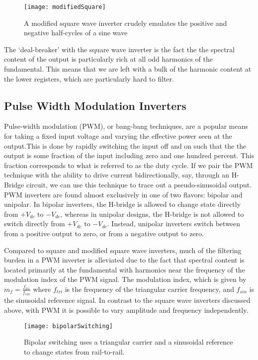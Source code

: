 \begin{figure}[h]
\centering
\texttt{[image: modifiedSquare]}
\caption{A modified square wave inverter crudely emulates the positive and negative half-cycles of a sine wave \cite{inverterFourier}}
\label{modifiedSquare}
\end{figure}

The `deal-breaker' with the square wave inverter is the fact the the spectral content of the output is particularly rich at all odd harmonics of the fundamental. This means that we are left with a bulk of the harmonic content at the lower registers, which are particularly hard to filter. 

\subsection{Pulse Width Modulation Inverters}
\label{pwmApproach}

Pulse-width modulation (PWM), or bang-bang techniques, are a popular means for taking a fixed input voltage and varying the effective power seen at the output.This is done by rapidly switching the input off and on such that the the output is some fraction of the input including zero and one hundred percent. This fraction corresponds to what is referred to as the duty cycle. If we pair the PWM technique with the ability to drive current bidirectionally, say, through an H-Bridge circuit, we can use this technique to trace out a pseudo-sinusoidal output. PWM inverters are found almost exclusively in one of two flavors: bipolar and unipolar. In bipolar inverters, the H-bridge is allowed to change state directly from $+V_{dc}$ to $-V_{dc}$, whereas in unipolar designs, the H-bridge is not allowed to switch directly from $+V_{dc}$ to $-V_{dc}$. Instead, unipolar inverters switch between from a positive output to zero, or from a negative output to zero.

Compared to square and modified square wave inverters, much of the filtering burden in a PWM inverter is alleviated due to the fact that spectral content is located primarily at the fundamental with harmonics near the frequency of the modulation index of the PWM signal. The modulation index, which is given by $m_f=\frac{f_{tri}}{f_{sin}}$ where $f_{tri}$ is the frequency of the triangular carrier frequency, and $f_{sin}$ is the sinusoidal reference signal. In contrast to the square wave inverters discussed above, with PWM it is possible to vary amplitude and frequency independently. 

\begin{figure}[h]
\centering
\texttt{[image: bipolarSwitching]}
\caption{Bipolar switching uses a triangular carrier and a sinusoidal reference to change states from rail-to-rail. \cite{inverterFourier}}
\label{bipolar}
\end{figure}

